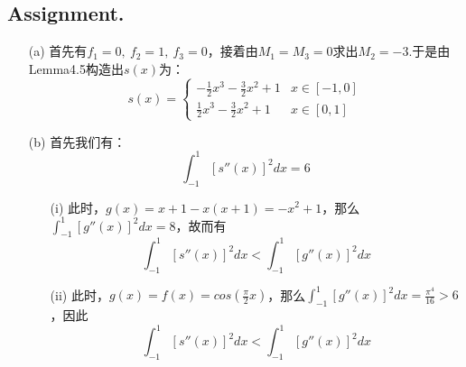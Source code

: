 \documentclass[a4paper,11.5pt,UTF8]{ctexart}
\begin{document}
\begin{large}
\subsection{Assignment.\uppercase\expandafter{}}
\begin{itemize}
	\item[(a)] 首先有$f_1=0,\ f_2=1,\ f_3=0$，接着由$M_1=M_3=0$求出$M_2=-3$.于是由Lemma4.5构造出$s(x)$为：
	\begin{equation*}
	s(x)=
		\begin{cases}
			-\frac{1}{2}x^3-\frac{3}{2}x^2+1& x\in [-1,0] \\
			\frac{1}{2}x^3-\frac{3}{2}x^2+1& x\in [0,1]
		\end{cases} 
	\end{equation*}
	\item[(b)] 首先我们有：
	$$\int_{-1}^{1}\left[s''(x)\right]^2dx=6$$
	\begin{itemize}
		\item[(i)] 此时，$g(x)=x+1-x(x+1)=-x^2+1$，那么
		$\int_{-1}^{1}\left[g''(x)\right]^2dx=8$，故而有
		$$\int_{-1}^{1}\left[s''(x)\right]^2dx < \int_{-1}^{1}\left[g''(x)\right]^2dx$$
		\item[(ii)] 此时，$g(x)=f(x)=cos(\frac{\pi}{2}x)$，那么$\int_{-1}^{1}\left[g''(x)\right]^2dx=\frac{\pi^4}{16}>6$，因此
		$$\int_{-1}^{1}\left[s''(x)\right]^2dx < \int_{-1}^{1}\left[g''(x)\right]^2dx$$
	\end{itemize}
\end{itemize}


\end{large}
\end{document}
